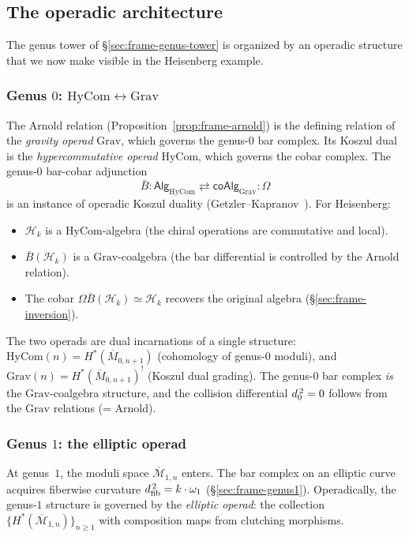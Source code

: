 \subsection{The operadic architecture}
\label{subsec:frame-operadic-architecture}

The genus tower of \S\ref{sec:frame-genus-tower} is organized by an
operadic structure that we now make visible in the Heisenberg example.

\subsubsection*{Genus $0$: $\mathrm{HyCom} \leftrightarrow \mathrm{Grav}$}

The Arnold relation (Proposition~\ref{prop:frame-arnold}) is the
defining relation of the \emph{gravity operad} $\mathrm{Grav}$,
which governs the genus-$0$ bar complex.  Its Koszul dual is the
\emph{hypercommutative operad} $\mathrm{HyCom}$, which governs the
cobar complex.  The genus-$0$ bar-cobar adjunction
\[
\bar{B} \colon \mathsf{Alg}_{\mathrm{HyCom}}
\rightleftarrows
\mathsf{coAlg}_{\mathrm{Grav}} :\! \Omega
\]
is an instance of operadic Koszul duality (Getzler--Kapranov~\cite{GK94}).
For Heisenberg:
\begin{itemize}
\item $\mathcal{H}_k$ is a $\mathrm{HyCom}$-algebra (the chiral
  operations are commutative and local).
\item $\bar{B}(\mathcal{H}_k)$ is a $\mathrm{Grav}$-coalgebra
  (the bar differential is controlled by the Arnold relation).
\item The cobar $\Omega\bar{B}(\mathcal{H}_k) \simeq \mathcal{H}_k$
  recovers the original algebra
  (\S\ref{sec:frame-inversion}).
\end{itemize}

The two operads are dual incarnations of a single structure:
$\mathrm{HyCom}(n) = H^*(\overline{M}_{0,n+1})$ (cohomology of
genus-$0$ moduli), and $\mathrm{Grav}(n) = H^*(\overline{M}_{0,n+1})^!$
(Koszul dual grading).  The genus-$0$ bar complex \emph{is} the
$\mathrm{Grav}$-coalgebra structure, and the collision differential
$d_0^{\,2} = 0$
follows from the $\mathrm{Grav}$ relations (= Arnold).

\subsubsection*{Genus $1$: the elliptic operad}

At genus~$1$, the moduli space $\overline{\mathcal{M}}_{1,n}$
enters.  The bar complex on an elliptic curve acquires fiberwise
curvature $d_{\mathrm{fib}}^{\,2} = k \cdot \omega_1$
(\S\ref{sec:frame-genus1}).  Operadically,
the genus-$1$ structure is governed by the \emph{elliptic operad}:
the collection $\{H^*(\overline{\mathcal{M}}_{1,n})\}_{n \geq 1}$
with composition maps from clutching morphisms.

